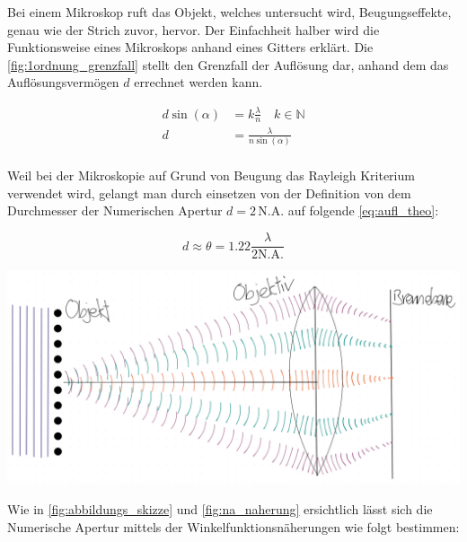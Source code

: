 \documentclass[11pt,ngerman]{scrartcl}
\begin{document}
\noindent Bei einem Mikroskop ruft das Objekt, welches untersucht wird, Beugungseffekte,
genau wie der Strich zuvor, hervor. Der Einfachheit halber wird die Funktionsweise
eines Mikroskops anhand eines Gitters erklärt. Die \autoref{fig:1ordnung_grenzfall} stellt
den Grenzfall der Auflösung dar, anhand dem das Auflösungsvermögen $d$
errechnet werden kann.

\begin{align}
	d \sin(\alpha) & = k \frac{\lambda}{n} \quad k \in \mathbb{N}                     \\
	d              & = \frac{\lambda}{n \sin(\alpha)}    \label{eq:abbe_ohne_beugung} \\
\end{align}


\noindent Weil bei der Mikroskopie auf Grund von Beugung das Rayleigh Kriterium
\cite{wiki_rayleigh_2021} verwendet wird, gelangt man durch einsetzen von der
Definition von dem Durchmesser der Numerischen Apertur $d = 2\, \mathrm{N.A.}$
auf folgende \autoref{eq:aufl_theo}:

\begin{equation}
	d \approx \theta = 1.22 \frac{\lambda}{2 \mathrm{N.A.}}
	\label{eq:aufl_theo}
\end{equation}


\begin{center}
	\begin{minipage}[t]{0.5\textwidth}
		\centering
		\includegraphics[width=\textwidth]{pics/abbe_ordnungen}
		\label{fig:abbildung_brennebene}
	\end{minipage}
\end{center}


\noindent Wie in \autoref{fig:abbildungs_skizze} und \autoref{fig:na_naherung} ersichtlich lässt sich die Numerische Apertur mittels der Winkelfunktionsnäherungen
wie folgt bestimmen:
\end{document}
